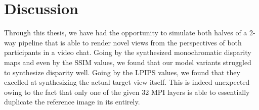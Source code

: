 \chapter{Discussion}\label{ch:discussion}





Through this thesis, we have had the opportunity to simulate both halves of a 2-way pipeline that is able to render novel views from the perspectives of both participants in a video chat. Going by the synthesized monochromatic disparity maps and even by the SSIM values, we found that our model variants struggled to synthesize disparity well. Going by the LPIPS values, we found that they excelled at synthesizing the actual target view itself. This is indeed unexpected owing to the fact that only one of the given 32 MPI layers is able to essentially duplicate the reference image in its entirely. 

